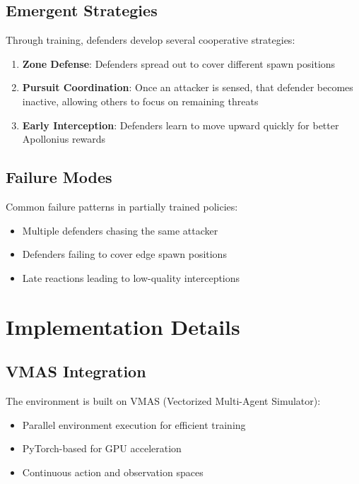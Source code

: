 \documentclass[11pt,a4paper]{article}
\begin{document}
\subsection{Emergent Strategies}

Through training, defenders develop several cooperative strategies:

\begin{enumerate}
    \item \textbf{Zone Defense}: Defenders spread out to cover different spawn positions
    \item \textbf{Pursuit Coordination}: Once an attacker is sensed, that defender becomes inactive, allowing others to focus on remaining threats
    \item \textbf{Early Interception}: Defenders learn to move upward quickly for better Apollonius rewards
\end{enumerate}

\subsection{Failure Modes}

Common failure patterns in partially trained policies:
\begin{itemize}
    \item Multiple defenders chasing the same attacker
    \item Defenders failing to cover edge spawn positions
    \item Late reactions leading to low-quality interceptions
\end{itemize}

\section{Implementation Details}

\subsection{VMAS Integration}

The environment is built on VMAS (Vectorized Multi-Agent Simulator):
\begin{itemize}
    \item Parallel environment execution for efficient training
    \item PyTorch-based for GPU acceleration
    \item Continuous action and observation spaces
\end{itemize}
\end{document}
